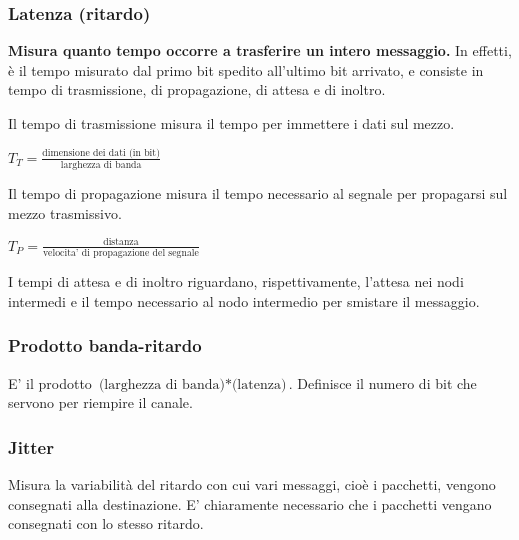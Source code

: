         \subsubsection{Latenza (ritardo)}
        
            \textbf{Misura quanto tempo occorre a trasferire un intero messaggio.} In effetti, è il tempo misurato dal primo bit spedito  all'ultimo bit arrivato, e consiste in tempo di trasmissione, di propagazione, di attesa e di inoltro.
            
            \vspace{3mm}
            
            Il tempo di trasmissione misura il tempo per immettere i dati sul mezzo.
            
            \begin{center}
                \(T_T = \frac{\text{dimensione dei dati (in bit)}}{\text{larghezza di banda}}\)
            \end{center}
            
            Il tempo di propagazione misura il tempo necessario al segnale per propagarsi sul mezzo trasmissivo.
            
            \begin{center}
                \(T_P = \frac{\text{distanza}}{\text{velocita' di propagazione del segnale}}\)
            \end{center}
            
            I tempi di attesa e di inoltro riguardano, rispettivamente, l'attesa nei nodi intermedi e il tempo necessario al nodo intermedio per smistare il messaggio.
            
        \subsubsection{Prodotto banda-ritardo}
        
            E' il prodotto \(\text{(larghezza di banda)}*\text{(latenza)}\). Definisce il numero di bit che servono per riempire il canale.
            
        \subsubsection{Jitter}
        
            Misura la variabilità del ritardo con cui vari messaggi, cioè i pacchetti, vengono consegnati alla destinazione. E' chiaramente necessario che i pacchetti vengano consegnati con lo stesso ritardo.